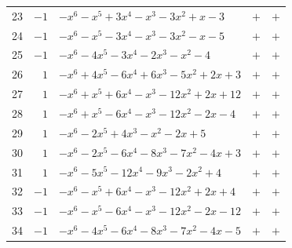 \documentclass[11pt]{article}
\begin{document}
\begin{longtable}{@{}rrlcc@{}}
23 & $-1$ & $-x^{6}-x^{5}+3x^{4}-x^{3}-3x^{2}+x-3$ & $+$ & $+$\\
24 & $-1$ & $-x^{6}-x^{5}-3x^{4}-x^{3}-3x^{2}-x-5$ & $+$ & $+$\\
25 & $-1$ & $-x^{6}-4x^{5}-3x^{4}-2x^{3}-x^{2}-4$ & $+$ & $+$\\
26 & $1$ & $-x^{6}+4x^{5}-6x^{4}+6x^{3}-5x^{2}+2x+3$ & $+$ & $+$\\
27 & $1$ & $-x^{6}+x^{5}+6x^{4}-x^{3}-12x^{2}+2x+12$ & $+$ & $+$\\
28 & $1$ & $-x^{6}+x^{5}-6x^{4}-x^{3}-12x^{2}-2x-4$ & $+$ & $+$\\
29 & $1$ & $-x^{6}-2x^{5}+4x^{3}-x^{2}-2x+5$ & $+$ & $+$\\
30 & $1$ & $-x^{6}-2x^{5}-6x^{4}-8x^{3}-7x^{2}-4x+3$ & $+$ & $+$\\
31 & $1$ & $-x^{6}-5x^{5}-12x^{4}-9x^{3}-2x^{2}+4$ & $+$ & $+$\\
32 & $-1$ & $-x^{6}-x^{5}+6x^{4}-x^{3}-12x^{2}+2x+4$ & $+$ & $+$\\
33 & $-1$ & $-x^{6}-x^{5}-6x^{4}-x^{3}-12x^{2}-2x-12$ & $+$ & $+$\\
34 & $-1$ & $-x^{6}-4x^{5}-6x^{4}-8x^{3}-7x^{2}-4x-5$ & $+$ & $+$\\
\end{longtable}
\endgroup
\end{document}
